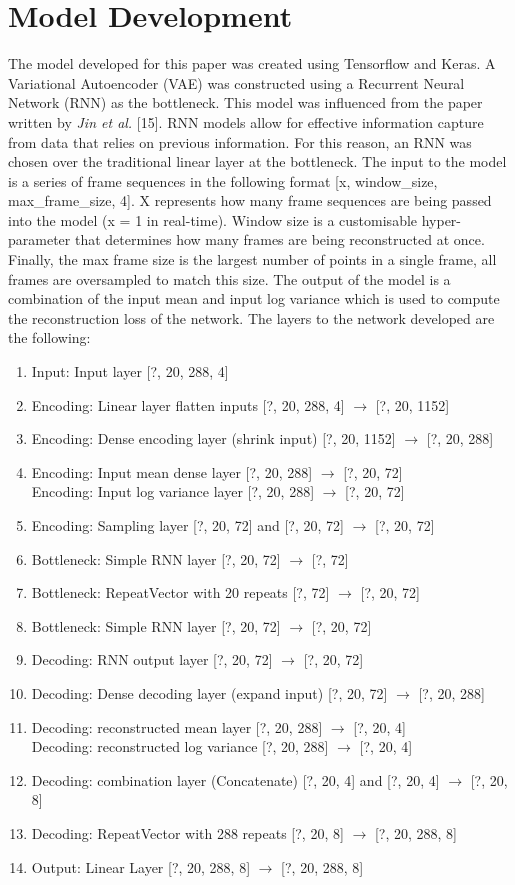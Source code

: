 \section{Model Development}
The model developed for this paper was created using Tensorflow and Keras. A Variational Autoencoder (VAE) was constructed using a Recurrent Neural Network (RNN) as the bottleneck. This model was influenced from the paper written by \textit{Jin et al.} [15]. RNN models allow for effective information capture from data that relies on previous information. For this reason, an RNN was chosen over the traditional linear layer at the bottleneck. The input to the model is a series of frame sequences in the following format [x, window\_size, max\_frame\_size, 4]. X represents how many frame sequences are being passed into the model (x = 1 in real-time). Window size is a customisable hyper-parameter that determines how many frames are being reconstructed at once. Finally, the max frame size is the largest number of points in a single frame, all frames are oversampled to match this size. The output of the model is a combination of the input mean and input log variance which is used to compute the reconstruction loss of the network. The layers to the network developed are the following:
\begin{enumerate}[noitemsep, topsep=0px]
    \item Input: Input layer [?, 20, 288, 4]
    \item Encoding: Linear layer flatten inputs [?, 20, 288, 4] $\to$ [?, 20, 1152]
    \item Encoding: Dense encoding layer (shrink input) [?, 20, 1152] $\to$ [?, 20, 288]
    \item Encoding: Input mean dense layer [?, 20, 288] $\to$ [?, 20, 72] \\ Encoding: Input log variance layer [?, 20, 288] $\to$ [?, 20, 72]
    \item Encoding: Sampling layer [?, 20, 72] and [?, 20, 72] $\to$ [?, 20, 72]
    \item Bottleneck: Simple RNN layer [?, 20, 72] $\to$ [?, 72]
    \item Bottleneck: RepeatVector with 20 repeats [?, 72] $\to$ [?, 20, 72]
    \item Bottleneck: Simple RNN layer [?, 20, 72] $\to$ [?, 20, 72]
    \item Decoding: RNN output layer [?, 20, 72] $\to$ [?, 20, 72]
    \item Decoding: Dense decoding layer (expand input) [?, 20, 72] $\to$ [?, 20, 288]
    \item Decoding: reconstructed mean layer [?, 20, 288] $\to$ [?, 20, 4] \\ Decoding: reconstructed log variance [?, 20, 288] $\to$ [?, 20, 4]
    \item Decoding: combination layer (Concatenate) [?, 20, 4] and [?, 20, 4] $\to$ [?, 20, 8]
    \item Decoding: RepeatVector with 288 repeats [?, 20, 8] $\to$ [?, 20, 288, 8] 
    \item Output: Linear Layer [?, 20, 288, 8] $\to$ [?, 20, 288, 8]
\end{enumerate}

